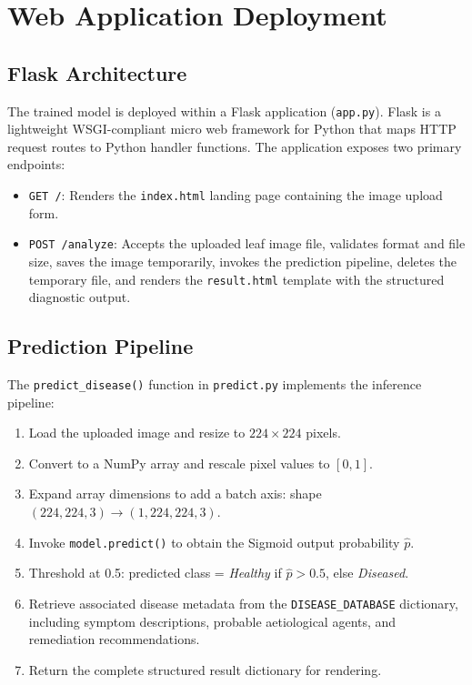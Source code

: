 \documentclass[12pt,a4paper]{report}
\begin{document}
\section{Web Application Deployment}

\subsection{Flask Architecture}

The trained model is deployed within a Flask application (\texttt{app.py}). Flask is a lightweight WSGI-compliant micro web framework for Python that maps HTTP request routes to Python handler functions. The application exposes two primary endpoints:

\begin{itemize}[itemsep=4pt]
    \item \texttt{GET /}: Renders the \texttt{index.html} landing page containing the image upload form.
    \item \texttt{POST /analyze}: Accepts the uploaded leaf image file, validates format and file size, saves the image temporarily, invokes the prediction pipeline, deletes the temporary file, and renders the \texttt{result.html} template with the structured diagnostic output.
\end{itemize}

\subsection{Prediction Pipeline}

The \texttt{predict\_disease()} function in \texttt{predict.py} implements the inference pipeline:

\begin{enumerate}[label=\arabic*., itemsep=4pt]
    \item Load the uploaded image and resize to $224 \times 224$ pixels.
    \item Convert to a NumPy array and rescale pixel values to $[0, 1]$.
    \item Expand array dimensions to add a batch axis: shape $(224, 224, 3) \rightarrow (1, 224, 224, 3)$.
    \item Invoke \texttt{model.predict()} to obtain the Sigmoid output probability $\hat{p}$.
    \item Threshold at 0.5: predicted class = \textit{Healthy} if $\hat{p} > 0.5$, else \textit{Diseased}.
    \item Retrieve associated disease metadata from the \texttt{DISEASE\_DATABASE} dictionary, including symptom descriptions, probable aetiological agents, and remediation recommendations.
    \item Return the complete structured result dictionary for rendering.
\end{enumerate}
\end{document}
